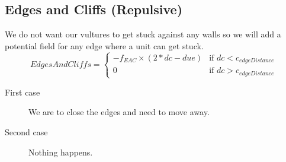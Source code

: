 	\subsection{Edges and Cliffs (Repulsive)}
		We do not want our vultures to get stuck against any walls so we will add a potential field for any edge where a unit can get stuck.
		\begin{displaymath}
			EdgesAndCliffs = \begin{cases}
					-f_{EAC} \times {(2*dc - due)} & \text{if } dc < c_{edgeDistance}\\
					0 & \text{if } dc > c_{edgeDistance}
				\end{cases}		
		\end{displaymath}
	\begin{description}	
		\item[First case] We are to close the edges and need to move away.  
		\item[Second case] Nothing happens. 
    \end{description}
     

